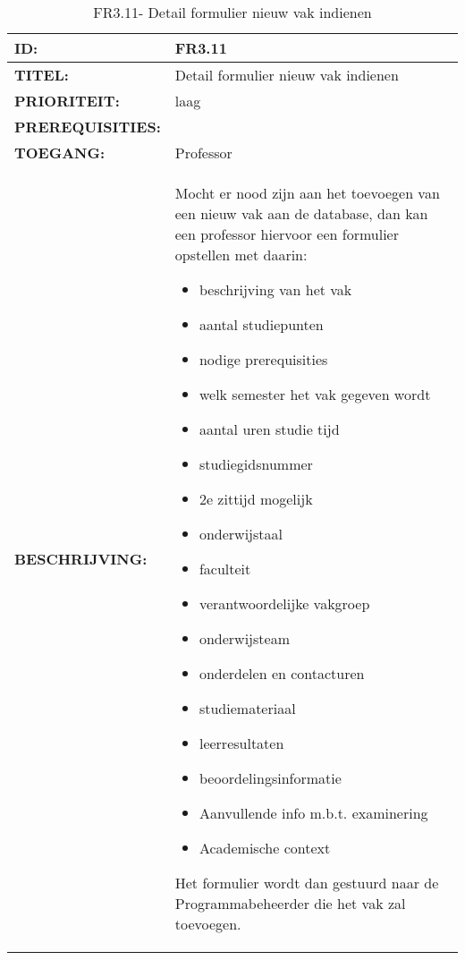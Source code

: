 \noindent\begin{table}[H]
            \begin{tabular}{l | p{10cm}} 
                \textbf{ID:} & FR3.11 \\ \hline
                \textbf{TITEL:} & Detail formulier nieuw vak indienen\\ \hline
                \textbf{PRIORITEIT:} &  laag \\ \hline
                \textbf{PREREQUISITIES:} & \\ \hline
                \textbf{TOEGANG:} & Professor \\ \hline
                \textbf{BESCHRIJVING:} & Mocht er nood zijn aan het toevoegen van een nieuw vak aan de database, dan kan een professor hiervoor een formulier opstellen met daarin:
        \begin{itemize}\itemsep1pt \parskip0pt \parsep0pt
                                        \item beschrijving van het vak
                                        \item aantal studiepunten
                                        \item nodige prerequisities
                                        \item welk semester het vak gegeven wordt
                                        \item aantal uren studie tijd
                                        \item studiegidsnummer
                                        \item 2e zittijd mogelijk
                                        \item onderwijstaal
                                        \item faculteit
                                        \item verantwoordelijke vakgroep
                                        \item onderwijsteam
                                        \item onderdelen en contacturen
                                        \item studiemateriaal
                                        \item leerresultaten
                                        \item beoordelingsinformatie
                                        \item Aanvullende info m.b.t. examinering
                                        \item Academische context
                                        \end{itemize}
                                        Het formulier wordt dan gestuurd naar de Programmabeheerder die het vak zal toevoegen. 
            \end{tabular}\\
            \caption{FR3.11- Detail formulier nieuw vak indienen}
            \label{tab:FR3.11 - Detail formulier nieuw vak indienen}
        \end{table}

